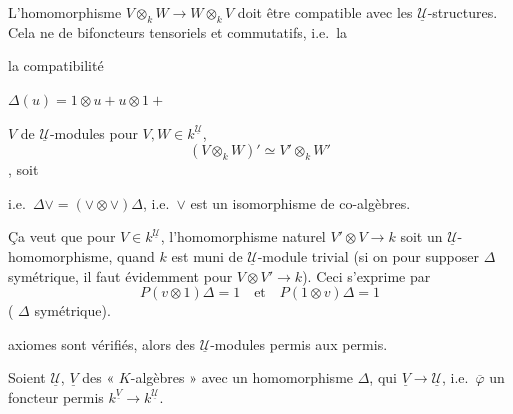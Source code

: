 \documentclass[11pt,a4paper]{article}
\begin{document}
 L'homomorphisme
$V \otimes_{k} W \to W \otimes_{k} V$ doit être compatible avec les
$\underline{\mathcal{U}}$-structures. Cela ne \ill{} de bifoncteurs tensoriels
 et commutatifs, i.e.\ la \ill{}

\ill{} la compatibilité 


$\Delta(u) = 1 \otimes u + u \otimes 1 + {}$ \ill{}

\struck{\ill{}} \ill{} $V$ \ill{} de $\underline{\mathcal{U}}$-modules
 \ill{} pour $V, W \in k^{\underline{\mathcal{U}}}$,
\[ (V \otimes_{k} W)' \simeq V' \otimes_{k} W' \]
\ill{}, soit \ill{}



i.e.\ $\Delta \vee = (\vee \otimes \vee)\Delta$, i.e.\ $\vee$ est un
isomorphisme de co-algèbres.


 Ça veut
que pour $V \in k^{\underline{\mathcal{U}}}$, l'homomorphisme naturel
$V' \otimes V \to k$ soit un $\underline{\mathcal{U}}$-homomorphisme, quand $k$
est muni  de $\underline{\mathcal{U}}$-module trivial (si
on \ill{} pour supposer $\Delta$ symétrique, il faut évidemment 
\ill{} pour $V \otimes V' \to k$). Ceci s'exprime par
\[ P(v \otimes 1)\Delta = 1 \quad\text{et}\quad P(1 \otimes v)\Delta = 1 \]
(\ill{} $\Delta$ \ill{} symétrique).

 axiomes sont vérifiés, alors \ill{} des
$\underline{\mathcal{U}}$-modules permis aux permis.

\struck{\ill{}}

Soient $\underline{\mathcal{U}}$, $\underline{V}$ des « $K$-algèbres » avec un
homomorphisme $\Delta$, qui  $\underline{V} \to
\underline{\mathcal{U}}$, i.e.\ $\overline{\varphi}$ un foncteur permis
$k^{\underline{V}} \to k^{\underline{\mathcal{U}}}$.
\end{document}
